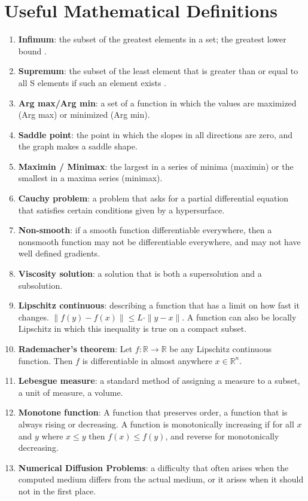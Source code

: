 \documentclass[11pt]{amsart}
\begin{document}
\section{Useful Mathematical Definitions}\label{mathdefs}
\begin{enumerate}
    \item\label{math:infimum} \textbf{Infimum}: the subset of the greatest elements in a set; the greatest lower bound \cite{infimumsupremum}.
    \item\label{math:supremum} \textbf{Supremum}: the subset of the least element that is greater than or equal to all S elements if such an element exists  \cite{infimumsupremum}.
    \item\label{math:Argmaxmin} \textbf{Arg max/Arg min}: a set of a function in which the values are maximized (Arg max) or minimized (Arg min).
    \item\label{math:saddlepoint} \textbf{Saddle point}: the point in which the slopes in all directions are zero, and the graph makes a saddle shape.
    \item\label{math:maximinminimax} \textbf{Maximin / Minimax}: the largest in a series of minima (maximin) or the smallest in a maxima series (minimax).
    \item\label{math:cauchyproblem} \textbf{Cauchy problem}: a problem that asks for a partial differential equation that satisfies certain conditions given by a hypersurface.
    \item\label{math:nonsmooth} \textbf{Non-smooth}: if a smooth function differentiable everywhere, then a nonsmooth function may not be differentiable everywhere, and may not have well defined gradients. 
    \item\label{math:viscosity} \textbf{Viscosity solution}: a solution that is both a supersolution and a subsolution.
    \item\label{math:lipschitz} \textbf{Lipschitz continuous}: describing a function that has a limit on how fast it changes. $\|f(y)-f(x)\| \leq L \cdot \|y-x\|$. A function can also be locally Lipschitz in which this inequality is true on a compact subset.
    \item\label{math:rademacher} \textbf{Rademacher's theorem}: Let $f: \mathbb{R} \rightarrow \mathbb{R} $ be any Lipschitz continuous function. Then $f$ is differentiable in almost anywhere $x \in \mathbb{R}^n$.
    \item\label{math:lebesgue} \textbf{Lebesgue measure}: a standard method of assigning a measure to a subset, a unit of measure, a volume. 
    \item\label{math:monotone} \textbf{Monotone function}: A function that preserves order, a function that is always rising or decreasing. A function is monotonically increasing if for all $x$ and $y$ where $x \leq y$ then $f(x) \leq f(y)$, and reverse for monotonically decreasing.
    \item\label{math:diffusionproblem} \textbf{Numerical Diffusion Problems}: a difficulty that often arises when the computed medium differs from the actual medium, or it arises when it should not in the first place.
\end{enumerate}
\end{document}
